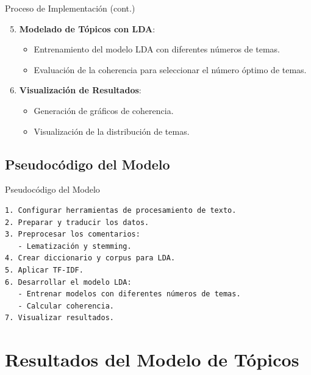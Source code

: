 \documentclass[aspectratio=169, xcolor={dvipsnames}, 10pt, spanish]{beamer}
\begin{document}
\begin{frame}{Proceso de Implementación (cont.)}
    \begin{enumerate}
        \setcounter{enumi}{4}
        \item \textbf{Modelado de Tópicos con LDA}:
        \begin{itemize}
            \item Entrenamiento del modelo LDA con diferentes números de temas.
            \item Evaluación de la coherencia para seleccionar el número óptimo de temas.
        \end{itemize}
        \item \textbf{Visualización de Resultados}:
        \begin{itemize}
            \item Generación de gráficos de coherencia.
            \item Visualización de la distribución de temas.
        \end{itemize}
    \end{enumerate}
\end{frame}

\subsection{Pseudocódigo del Modelo}
\begin{frame}[fragile]{Pseudocódigo del Modelo}
    \footnotesize
    \begin{verbatim}
1. Configurar herramientas de procesamiento de texto.
2. Preparar y traducir los datos.
3. Preprocesar los comentarios:
   - Lematización y stemming.
4. Crear diccionario y corpus para LDA.
5. Aplicar TF-IDF.
6. Desarrollar el modelo LDA:
   - Entrenar modelos con diferentes números de temas.
   - Calcular coherencia.
7. Visualizar resultados.
    \end{verbatim}
\end{frame}

\section{Resultados del Modelo de Tópicos}
\end{document}
